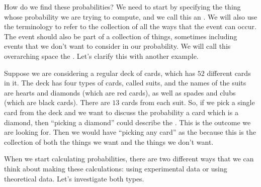 \documentclass{ximera}
\begin{document}
How do we find these probabilities? We need to start by specifying the thing whose probability we are trying to compute, and we call this an . We will also use the terminology  to refer to the collection of all the ways that the event can occur. The event should also be part of a collection of things, sometimes including events that we don't want to consider in our probability. We will call this overarching space the . Let's clarify this with another example.

\begin{example}
Suppose we are considering a regular deck of cards, which has $52$ different cards in it. The deck has four types of cards, called suits, and the names of the suits are hearts and diamonds (which are red cards), as well as spades and clubs (which are black cards). There are $13$ cards from each suit. So, if we pick a single card from the deck and we want to discuss the probability a card which is a diamond, then ``picking a diamond'' could describe the . This is the outcome we are looking for. Then we would have ``picking any card'' as the  because this is the collection of both the things we want and the things we don't want.
\end{example}

When we start calculating probabilities, there are two different ways that we can think about making these calculations: using experimental data or using theoretical data. Let's investigate both types.
\end{document}
